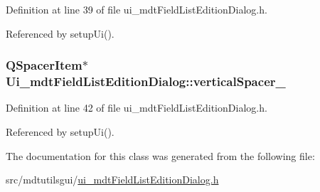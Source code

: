 Definition at line 39 of file ui\-\_\-mdt\-Field\-List\-Edition\-Dialog.\-h.



Referenced by setup\-Ui().

\hypertarget{class_ui__mdt_field_list_edition_dialog_a865d7bb493b2ae9c696ebf7f7f5b9b09}{
\subsubsection[{vertical\-Spacer\-\_\-2}]{\setlength{\rightskip}{0pt plus 5cm}Q\-Spacer\-Item$\ast$ Ui\-\_\-mdt\-Field\-List\-Edition\-Dialog\-::vertical\-Spacer\-\_}}\label{class_ui__mdt_field_list_edition_dialog_a865d7bb493b2ae9c696ebf7f7f5b9b09}


Definition at line 42 of file ui\-\_\-mdt\-Field\-List\-Edition\-Dialog.\-h.



Referenced by setup\-Ui().



The documentation for this class was generated from the following file\-:\begin{DoxyCompactItemize}
\item 
src/mdtutilsgui/\hyperlink{ui__mdt_field_list_edition_dialog_8h}{ui\-\_\-mdt\-Field\-List\-Edition\-Dialog.\-h}\end{DoxyCompactItemize}
